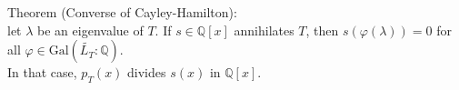 \documentclass[preview]{standalone}
\begin{document}
\begin{center}
Theorem (Converse of Cayley-Hamilton): \\ let $\lambda$ be an eigenvalue of $T$. If $s \in \mathbb{Q}[x]$ annihilates $T$, then $s(\varphi(\lambda)) = 0$ for all $\varphi \in \text{Gal}\left(\widetilde{L_T} : \mathbb{Q}\right)$. \\[0.2cm] In that case, $p_T(x)$ divides $s(x)$ in $\mathbb{Q}[x]$.
\end{center}
\end{document}
